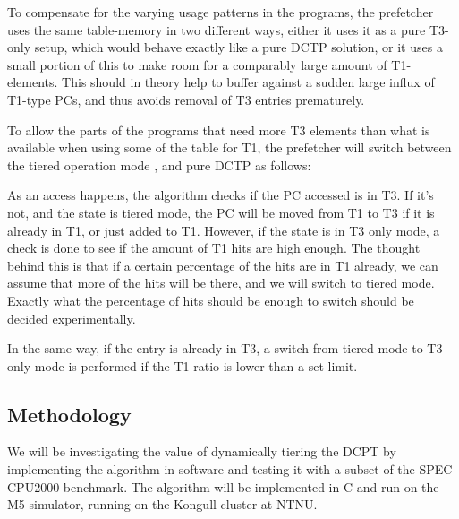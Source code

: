 To compensate for the varying usage patterns in the programs, the prefetcher
uses the same table-memory in two different ways, either it uses it as a pure
T3-only setup, which would behave exactly like a pure DCTP solution, or it
uses a small portion of this to make room for a comparably large amount of
T1-elements. This should in theory help to buffer against a sudden large
influx of T1-type PCs, and thus avoids removal of T3 entries
prematurely.

To allow the parts of the programs that need more T3 elements than what is
available when using some of the table for T1, the prefetcher will switch
between the tiered operation mode , and pure DCTP as follows:

As an access happens, the algorithm checks if the PC accessed is in T3. If it's
not, and the state is tiered mode, the PC will be moved from T1 to T3 if it is
already in T1, or just added to T1. However, if the state is in T3 only
mode, a check is done to see if the amount of T1 hits are high enough. The
thought behind this is that if a certain percentage of the hits are in T1
already, we can assume that more of the hits will be there, and we will switch
to tiered mode. Exactly what the percentage of hits should be enough to
switch should be decided experimentally.

In the same way, if the entry is already in T3, a switch from tiered mode to
T3 only mode is performed if the T1 ratio is lower than a set limit.


\subsection{Methodology}

We will be investigating the value of dynamically tiering the DCPT by
implementing the algorithm in software and testing it with a subset of the SPEC
CPU2000 benchmark.  The algorithm will be implemented in C and run on the M5
simulator, running on the Kongull cluster at NTNU.
